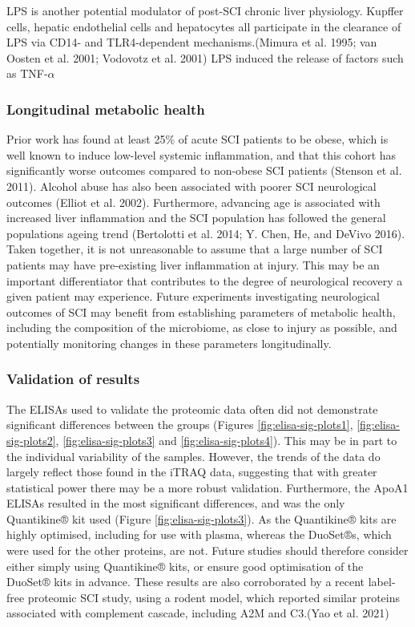 \documentclass[9pt,lineno]{elife}
\begin{document}
LPS is another potential modulator of post-SCI chronic liver physiology.
Kupffer cells, hepatic endothelial cells and hepatocytes all participate in the clearance of LPS via CD14- and TLR4-dependent mechanisms.(Mimura et al. 1995; van Oosten et al. 2001; Vodovotz et al. 2001)
LPS induced the release of factors such as TNF-\(\alpha\)

\hypertarget{longitudinal-metabolic-health}{%
\subsubsection{Longitudinal metabolic health}\label{longitudinal-metabolic-health}}

Prior work has found at least 25\% of acute SCI patients to be obese, which is well known to induce low-level systemic inflammation, and that this cohort has significantly worse outcomes compared to non-obese SCI patients (Stenson et al. 2011).
Alcohol abuse has also been associated with poorer SCI neurological outcomes (Elliot et al. 2002).
Furthermore, advancing age is associated with increased liver inflammation and the SCI population has followed the general populations ageing trend (Bertolotti et al. 2014; Y. Chen, He, and DeVivo 2016).
Taken together, it is not unreasonable to assume that a large number of SCI patients may have pre-existing liver inflammation at injury.
This may be an important differentiator that contributes to the degree of neurological recovery a given patient may experience.
Future experiments investigating neurological outcomes of SCI may benefit from establishing parameters of metabolic health, including the composition of the microbiome, as close to injury as possible, and potentially monitoring changes in these parameters longitudinally.

\hypertarget{validation-of-results}{%
\subsubsection{Validation of results}\label{validation-of-results}}

The ELISAs used to validate the proteomic data often did not demonstrate significant differences between the groups (Figures \ref{fig:elisa-sig-plots1}, \ref{fig:elisa-sig-plots2}, \ref{fig:elisa-sig-plots3} and \ref{fig:elisa-sig-plots4}).
This may be in part to the individual variability of the samples.
However, the trends of the data do largely reflect those found in the iTRAQ data, suggesting that with greater statistical power there may be a more robust validation.
Furthermore, the ApoA1 ELISAs resulted in the most significant differences, and was the only Quantikine® kit used (Figure \ref{fig:elisa-sig-plots3}).
As the Quantikine® kits are highly optimised, including for use with plasma, whereas the DuoSet®s, which were used for the other proteins, are not.
Future studies should therefore consider either simply using Quantikine® kits, or ensure good optimisation of the DuoSet® kits in advance.
These results are also corroborated by a recent label-free proteomic SCI study, using a rodent model, which reported similar proteins associated with complement cascade, including A2M and C3.(Yao et al. 2021)
\end{document}
